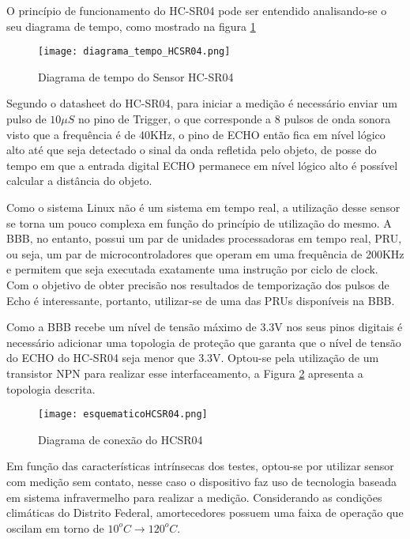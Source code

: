 		O princípio de funcionamento do HC-SR04 pode ser entendido analisando-se o seu diagrama de tempo, como mostrado na figura \ref{diagramatempo}

		\begin{figure}[!h]
			\centering
			\texttt{[image: diagrama\_tempo\_HCSR04.png]}
			\caption{Diagrama de tempo do Sensor HC-SR04}
			\label{diagramatempo}
		\end{figure}

		Segundo o datasheet do HC-SR04, para iniciar a medição é necessário enviar um pulso de $10\mu S$ no pino de Trigger, o que corresponde a 8 pulsos de onda sonora visto que a frequência é de 40KHz, o pino de ECHO então fica em nível lógico alto até que seja detectado o sinal da onda refletida pelo objeto, de posse do tempo em que a entrada digital ECHO permanece em nível lógico alto é possível calcular a distância do objeto.

		Como o sistema Linux não é um sistema em tempo real, a utilização desse sensor se torna um pouco complexa em função do princípio de utilização do mesmo. A BBB, no entanto, possui um par de unidades processadoras em tempo real, PRU, ou seja, um par de microcontroladores que operam em uma frequência de 200KHz e permitem que seja executada exatamente uma instrução por ciclo de clock. Com o objetivo de obter precisão nos resultados de temporização dos pulsos de Echo é interessante, portanto, utilizar-se de uma das PRUs disponíveis na BBB.

		Como a BBB recebe um nível de tensão máximo de 3.3V nos seus pinos digitais é necessário adicionar uma topologia de proteção que garanta que o nível de tensão do ECHO do HC-SR04 seja menor que 3.3V. Optou-se pela utilização de um transistor NPN para realizar esse interfaceamento, a Figura \ref{esquematicoHCSR04} apresenta a topologia descrita.

		\begin{figure}[!h]
			\centering
			\texttt{[image: esquematicoHCSR04.png]}
			\caption{Diagrama de conexão do HCSR04}
			\label{esquematicoHCSR04}
		\end{figure}



		Em função das características intrínsecas dos testes, optou-se por utilizar sensor com medição sem contato, nesse caso o dispositivo faz uso de tecnologia baseada em sistema infravermelho para realizar a medição. Considerando as condições climáticas do Distrito Federal, amortecedores possuem uma faixa de operação que oscilam em torno de $10^oC \rightarrow 120^oC$. 

